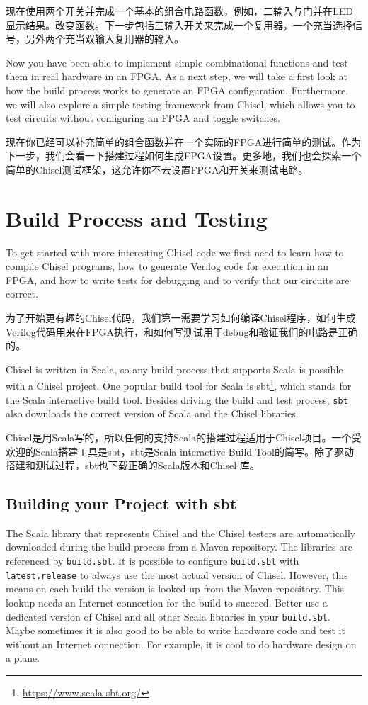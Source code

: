 \documentclass[%
    10pt,
    headinclude, footexclude,
    openright, %
    notitlepage,
    cleardoubleempty,
    headsepline,
    pointlessnumbers,
    bibtotoc, idxtotoc,
    ]{scrbook}
\newcommand{\code}[1]{{\small{\texttt{#1}}}}
\newcommand{\myref}[2]{\href{#1}{#2}}
\renewcommand{\myref}[2]{{#2}{\footnote{\url{#1}}}}
\begin{document}
现在使用两个开关并完成一个基本的组合电路函数，例如，二输入与门并在LED显示结果。改变函数。下一步包括三输入开关来完成一个复用器，一个充当选择信号，另外两个充当双输入复用器的输入。


Now you have been able to implement simple combinational functions and test them
in real hardware in an FPGA. As a next step, we will take a first look at how the build
process works to generate an FPGA configuration. Furthermore, we will also
explore a simple testing framework from Chisel, which allows you to test circuits
without configuring an FPGA and toggle switches.

现在你已经可以补充简单的组合函数并在一个实际的FPGA进行简单的测试。作为下一步，我们会看一下搭建过程如何生成FPGA设置。更多地，我们也会探索一个简单的Chisel测试框架，这允许你不去设置FPGA和开关来测试电路。


\chapter{Build Process and Testing}

To get started with more interesting Chisel code we first need to learn how to compile
Chisel programs, how to generate Verilog code for execution in an FPGA, and how
to write tests for debugging and to verify that our circuits are correct.

为了开始更有趣的Chisel代码，我们第一需要学习如何编译Chisel程序，如何生成Verilog代码用来在FPGA执行，和如何写测试用于debug和验证我们的电路是正确的。


Chisel is written in Scala, so any build process that supports Scala is possible
with a Chisel project. One popular build tool for Scala is \myref{https://www.scala-sbt.org/}{sbt},
which stands for the Scala interactive build tool.
Besides driving the build and test process, \code{sbt} also downloads the correct
version of Scala and the Chisel libraries.

Chisel是用Scala写的，所以任何的支持Scala的搭建过程适用于Chisel项目。一个受欢迎的Scala搭建工具是sbt，sbt是Scala interactive Build Tool的简写。除了驱动搭建和测试过程，sbt也下载正确的Scala版本和Chisel 库。


\section{Building your Project with sbt}

The Scala library that represents Chisel and the Chisel testers are automatically
downloaded during the build process from a Maven repository.
The libraries are referenced by \code{build.sbt}. It is possible to configure \code{build.sbt}
with \code{latest.release} to always use the most actual version of Chisel.
However, this means on each build the version is looked up from the Maven
repository. This lookup needs an Internet connection for the build to succeed.
Better use a dedicated version of Chisel and all other Scala libraries in your \code{build.sbt}.
Maybe sometimes it is also good to be able to write hardware code and test it without an Internet connection.
For example, it is cool to do hardware design on a plane.
\end{document}
